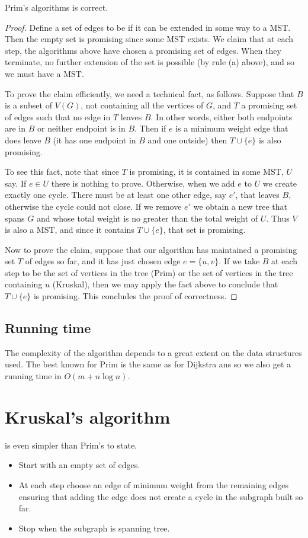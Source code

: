 \begin{Theorem} \label{thm:prim}
Prim's algorithms is correct.
\end{Theorem}
\begin{proof}
Define a set of edges to be  if it can be extended in some way to a MST. 
Then the empty set is promising since some MST exists. 
We claim that at each step, the algorithms above have chosen a promising set of edges. 
When they terminate, no further extension of the set is possible (by rule (a) above), 
and so we must have a MST.

To prove the claim efficiently, we need a technical fact, as follows.
Suppose that $B$ is a subset of $V(G)$, not containing all the vertices
of $G$, and $T$ a promising set of edges such that no edge in $T$ leaves
$B$. In other words, either both endpoints are in $B$ or neither
endpoint is in $B$. Then if $e$ is a minimum weight edge that does leave
$B$ (it has one endpoint in $B$ and one outside) then $T\cup\{e\}$ is
also promising.

To see this fact, note that since $T$ is promising, it is contained in
some MST, $U$ say. If $e\in U$ there is nothing to prove. Otherwise,
when we add $e$ to $U$ we create exactly one cycle. There must be at
least one other edge, say $e'$, that leaves $B$, otherwise the cycle
could not close. If we remove $e'$ we obtain a new tree that spans $G$
and whose total weight is no greater than the total weight of $U$. Thus
$V$ is also a MST, and since it contains $T\cup\{e\}$, that set is
promising.

Now to prove the claim, suppose that our algorithm has maintained a
promising set $T$ of edges so far, and it has just chosen edge $e=\{u,v\}$.
If we take $B$ at each step to be the set of vertices in the tree (Prim)
or the set of vertices in the tree containing $u$ (Kruskal), then we may
apply the fact above to conclude that $T \cup \{e\}$ is promising. This
concludes the proof of correctness.
\end{proof}

\subsection{Running time}
The complexity of the algorithm depends to a great extent on the data
structures used. The best known for Prim is the same as for Dijkstra
ans so we also get a running time in $O(m + n\log n)$.

\section{Kruskal's algorithm}
 is even simpler than Prim's to state.
\begin{itemize}
\item Start with an empty set of edges.
\item At each step choose an edge of minimum weight from the remaining edges ensuring 
that adding the edge does not create a cycle in the subgraph built so far. 
\item Stop when the subgraph is spanning tree.
\end{itemize}

